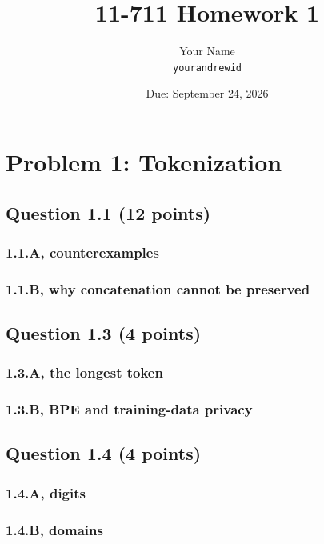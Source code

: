 \documentclass[11pt]{article}
\title{11-711 Homework 1}
\author{Your Name \\ \texttt{yourandrewid}}
\date{Due: September 24, 2026}
\begin{document}
\maketitle

\section*{Problem 1: Tokenization}

\subsection*{Question 1.1 (12 points)}
\subsubsection*{1.1.A, counterexamples}

\subsubsection*{1.1.B, why concatenation cannot be preserved}

\subsection*{Question 1.3 (4 points)}
\subsubsection*{1.3.A, the longest token}
\subsubsection*{1.3.B, BPE and training-data privacy}

\subsection*{Question 1.4 (4 points)}
\subsubsection*{1.4.A, digits}
\subsubsection*{1.4.B, domains}
\end{document}
